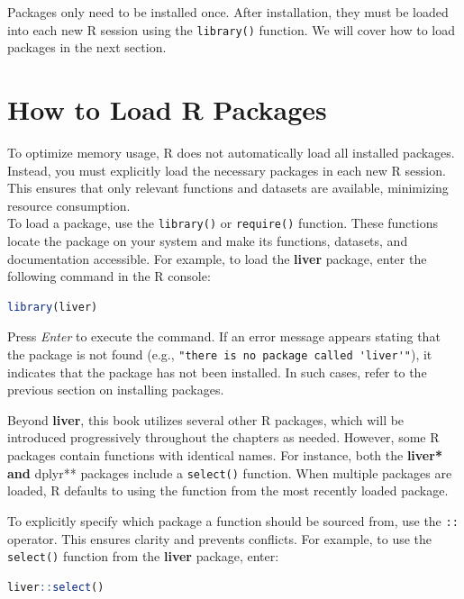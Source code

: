 \documentclass[
]{book}
\newcommand{\passthrough}[1]{#1}
\theoremstyle{definition}
\theoremstyle{definition}
\theoremstyle{definition}
\theoremstyle{definition}
\theoremstyle{remark}
\begin{document}
Packages only need to be installed once. After installation, they must be loaded into each new R session using the \passthrough{\lstinline!library()!} function. We will cover how to load packages in the next section.

\section{How to Load R Packages}\label{how-to-load-r-packages}

To optimize memory usage, R does not automatically load all installed packages. Instead, you must explicitly load the necessary packages in each new R session. This ensures that only relevant functions and datasets are available, minimizing resource consumption.\\
To load a package, use the \passthrough{\lstinline!library()!} or \passthrough{\lstinline!require()!} function. These functions locate the package on your system and make its functions, datasets, and documentation accessible. For example, to load the \textbf{liver} package, enter the following command in the R console:

\begin{lstlisting}[language=R]
library(liver)
\end{lstlisting}

Press \emph{Enter} to execute the command. If an error message appears stating that the package is not found (e.g., \passthrough{\lstinline!"there is no package called 'liver'"!}), it indicates that the package has not been installed. In such cases, refer to the previous section on installing packages.

Beyond \textbf{liver}, this book utilizes several other R packages, which will be introduced progressively throughout the chapters as needed. However, some R packages contain functions with identical names. For instance, both the \textbf{liver* and }dplyr** packages include a \passthrough{\lstinline!select()!} function. When multiple packages are loaded, R defaults to using the function from the most recently loaded package.

To explicitly specify which package a function should be sourced from, use the \passthrough{\lstinline!::!} operator. This ensures clarity and prevents conflicts. For example, to use the \passthrough{\lstinline!select()!} function from the \textbf{liver} package, enter:

\begin{lstlisting}[language=R]
liver::select()
\end{lstlisting}
\end{document}
